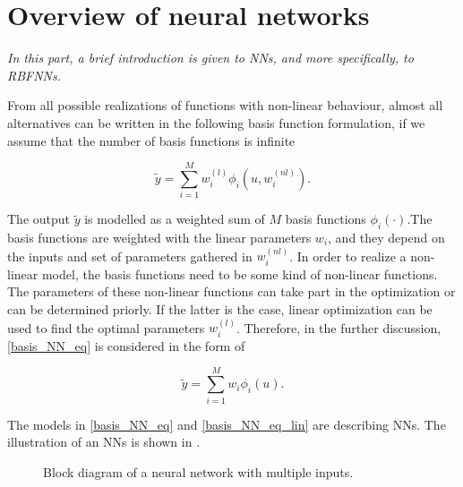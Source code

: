 
\chapter{Overview of neural networks}
\label{neural_networks}

\emph{In this part, a brief introduction is given to NNs, and more specifically, to RBFNNs. }

From all possible realizations of functions with non-linear behaviour, almost all alternatives can be written in the following basis function formulation, if we assume that the number of basis functions is infinite \cite{norgaard2003neural}

\begin{equation}
\label{basis_NN_eq}
\tilde{y} = \sum_{i = 1}^M w^{(l)}_i \phi_i(u, w^{(nl)}_i).
\end{equation}

The output $\tilde{y}$ is modelled as a weighted sum of $M$ basis functions $\phi_i(\cdot)$.The basis functions are weighted with the linear parameters $w_i$, and they depend on the inputs and set of parameters gathered in $w^{(nl)}_i$. In order to realize a non-linear model, the basis functions need to be some kind of non-linear functions. The parameters of these non-linear functions can take part in the optimization or can be determined priorly. If the latter is the case, linear optimization can be used to find the optimal parameters $w^{(l)}_i$. Therefore, in the further discussion, \eqref{basis_NN_eq} is considered in the form of

 \begin{equation}
\label{basis_NN_eq_lin}
\tilde{y} = \sum_{i = 1}^M w_i \phi_i(u).
\end{equation}

The models in \eqref{basis_NN_eq} and \eqref{basis_NN_eq_lin} are describing NNs. The illustration of an NNs is shown in .

\vspace{-5mm}

\begin{figure}[H]
\centering
 
\caption{Block diagram of a neural network with multiple inputs.}
\label{fig:nn_example_block}
\end{figure}

\vspace{-3mm}

